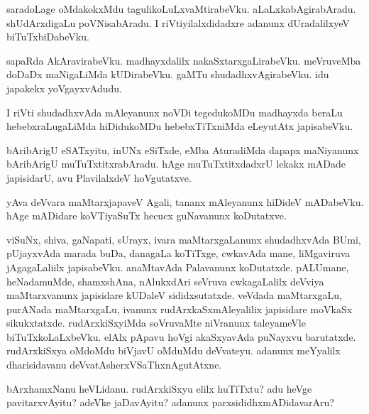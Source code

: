 \documentclass{article}
\begin{document}
\begin{mng}%
saradoLage oMdakokxMdu tagulikoLuLxvaMtirabeVku. aLaLxkabAgirabAradu. 
shUdArxdigaLu poVNisabAradu. I riVtiyilalxdidadxre adanunx 
dUradalilxyeV biTuTxbiDabeVku.
\end{mng}

\begin{mng}%
sapaRda AkAravirabeVku. madhayxdalilx nakaSxtarxgaLirabeVku. 
meVruveMba doDaDx maNigaLiMda kUDirabeVku. gaMTu shudadhxvAgirabeVku. 
idu japakekx yoVgayxvAdudu.
\end{mng}

\begin{mng}%
I riVti shudadhxvAda mAleyanunx noVDi tegedukoMDu madhayxda beraLu 
hebebxraLugaLiMda hiDidukoMDu hebebxTiTxniMda eLeyutAtx japisabeVku.
\end{mng}

\begin{mng}%
bAribArigU eSATxyitu, inUNx eSiTxde, eMba AturadiMda dapapx maNiyanunx 
bAribArigU muTuTxtitxrabAradu. hAge muTuTxtitxdadxrU lekakx mADade 
japisidarU, avu PlavilalxdeV hoVgutatxve.
\end{mng}

\begin{mng}%
yAva deVvara maMtarxjapaveV Agali, tananx mAleyanunx hiDideV 
mADabeVku. hAge mADidare koVTiyaSuTx hecucx guNavanunx koDutatxve.
\end{mng}

\begin{mng}%
viSuNx, shiva, gaNapati, sUrayx, ivara maMtarxgaLanunx shudadhxvAda 
BUmi, pUjayxvAda marada buDa, danagaLa koTiTxge, cwkavAda mane, 
liMgaviruva jAgagaLaliilx japisabeVku. anaMtavAda Palavanunx 
koDutatxde. pALUmane, heNadamuMde, shamxshAna, nAlukxdAri seVruva 
cwkagaLalilx deVviya maMtarxvanunx japisidare kUDaleV sididxsutatxde. 
veVdada maMtarxgaLu, purANada maMtarxgaLu, ivanunx 
rudArxkaSxmAleyalilix japisidare moVkaSx sikukxtatxde. rudArxkiSxyiMda 
soVruvaMte niVranunx taleyameVle biTuTxkoLaLxbeVku. elAlx pApavu hoVgi 
akaSxyavAda puNayxvu barutatxde. rudArxkiSxya oMdoMdu biVjavU oMduMdu 
deVvateyu. adanunx meYyalilx dharisidavanu 
deVvatAsherxVSaThxnAgutAtxne. 
\end{mng}

\begin{mng}%
bArxhamxNanu heVLidanu. rudArxkiSxyu elilx huTiTxtu? adu heVge 
pavitarxvAyitu? adeVke jaDavAyitu? adanunx parxsididhxmADidavarAru?
\end{mng}
\end{document}
